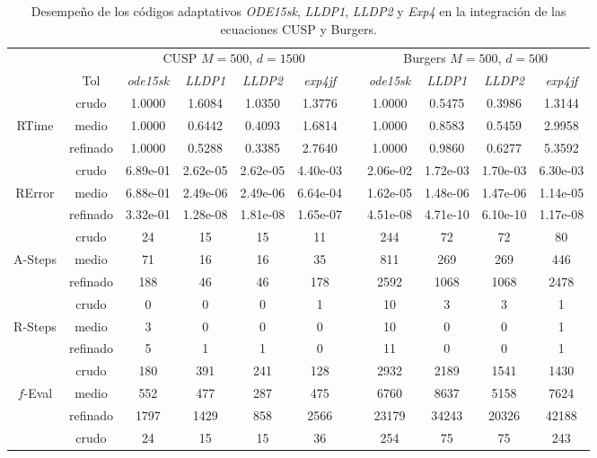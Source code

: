 \begin{table}
	\caption{Desempeño de los códigos adaptativos \emph{ODE15sk}, \emph{LLDP1}, \emph{LLDP2} y \emph{Exp4} en la integración de las ecuaciones  CUSP y Burgers.}
	\label{tab:cuspburg}
	\begin{adjustbox}{width=0.95\columnwidth,center}
		\begin{tabular}{ccccccccccc}
			\hline
			&  & \multicolumn{4}{c}{CUSP $M=500$, $d=1500$} &  & \multicolumn{4}{c}{Burgers $M=500$, $d=500$} \\
			\cline{3-6}\cline{8-11} & Tol & \emph{ode15sk} & \emph{LLDP1} & \emph{LLDP2} & \emph{exp4jf} &  & \emph{ode15sk} & \emph{LLDP1} & \emph{LLDP2} & \emph{exp4jf} \\
			\hline
			& crudo & 1.0000 & 1.6084 & 1.0350 & 1.3776 &  & 1.0000 & 0.5475 & 0.3986 & 1.3144 \\
			RTime & medio & 1.0000 & 0.6442 & 0.4093 & 1.6814 &  & 1.0000 & 0.8583 & 0.5459 & 2.9958 \\
			& refinado & 1.0000 & 0.5288 & 0.3385 & 2.7640 &  & 1.0000 & 0.9860 & 0.6277 & 5.3592 \\
			\hline
			& crudo & 6.89e-01 & 2.62e-05 & 2.62e-05 & 4.40e-03 &  & 2.06e-02 & 1.72e-03 & 1.70e-03 & 6.30e-03 \\
			RError & medio & 6.88e-01 & 2.49e-06 & 2.49e-06 & 6.64e-04 &  & 1.62e-05 & 1.48e-06 & 1.47e-06 & 1.14e-05 \\
			& refinado & 3.32e-01 & 1.28e-08 & 1.81e-08 & 1.65e-07 &  & 4.51e-08 & 4.71e-10 & 6.10e-10 & 1.17e-08 \\
			\hline
			& crudo & 24 & 15 & 15 & 11 &  & 244 & 72 & 72 & 80 \\
			A-Steps & medio & 71 & 16 & 16 & 35 &  & 811 & 269 & 269 & 446 \\
			& refinado & 188 & 46 & 46 & 178 &  & 2592 & 1068 & 1068 & 2478 \\
			\hline
			& crudo & 0 & 0 & 0 & 1 &  & 10 & 3 & 3 & 1 \\
			R-Steps & medio & 3 & 0 & 0 & 0 &  & 10 & 0 & 0 & 1 \\
			& refinado & 5 & 1 & 1 & 0 &  & 11 & 0 & 0 & 1 \\
			\hline
			& crudo & 180 & 391 & 241 & 128 &  & 2932 & 2189 & 1541 & 1430 \\
			$f$-Eval & medio & 552 & 477 & 287 & 475 &  & 6760 & 8637 & 5158 & 7624 \\
			& refinado & 1797 & 1429 & 858 & 2566 &  & 23179 & 34243 & 20326 & 42188 \\
			\hline
			& crudo & 24 & 15 & 15 & 36 &  & 254 & 75 & 75 & 243 \\

\end{tabular}
\end{adjustbox}
\end{table}
